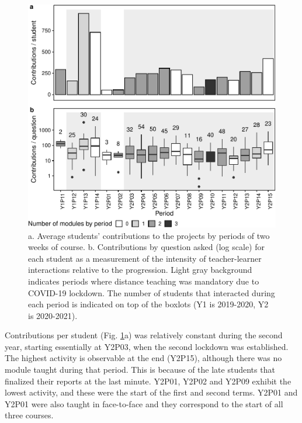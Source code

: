 \documentclass{aims}
\theoremstyle{definition}
\begin{document}
\begin{figure}
\includegraphics[width=1\linewidth]{teaching_data_science_files/figure-latex/fig_support_by_time-1} \caption{\label{fig:fig_support_by_time} a. Average students' contributions to the projects by periods of two weeks of course. b. Contributions by question asked (log scale) for each student as a measurement of the intensity of teacher-learner interactions relative to the progression. Light gray background indicates periods where distance teaching was mandatory due to COVID-19 lockdown. The number of students that interacted during each period is indicated on top of the boxlots (Y1 is 2019-2020, Y2 is 2020-2021).}\label{fig:fig_support_by_time}
\end{figure}

Contributions per student (Fig. \ref {fig:fig_support_by_time}a) was
relatively constant during the second year, starting essentially at
Y2P03, when the second lockdown was established. The highest activity is
observable at the end (Y2P15), although there was no module taught
during that period. This is because of the late students that finalized
their reports at the last minute. Y2P01, Y2P02 and Y2P09 exhibit the
lowest activity, and these were the start of the first and second terms.
Y2P01 and Y2P01 were also taught in face-to-face and they correspond to
the start of all three courses.
\end{document}
